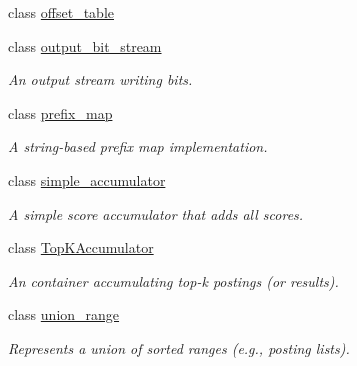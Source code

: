 \begin{DoxyCompactItemize}
class \mbox{\hyperlink{classirk_1_1offset__table}{offset\+\_\+table}}
\item 
class \mbox{\hyperlink{classirk_1_1output__bit__stream}{output\+\_\+bit\+\_\+stream}}
\begin{DoxyCompactList}\small\item\em An output stream writing bits. \end{DoxyCompactList}\item 
class \mbox{\hyperlink{classirk_1_1prefix__map}{prefix\+\_\+map}}
\begin{DoxyCompactList}\small\item\em A string-\/based prefix map implementation. \end{DoxyCompactList}\item 
class \mbox{\hyperlink{classirk_1_1simple__accumulator}{simple\+\_\+accumulator}}
\begin{DoxyCompactList}\small\item\em A simple score accumulator that adds all scores. \end{DoxyCompactList}\item 
class \mbox{\hyperlink{classirk_1_1TopKAccumulator}{Top\+K\+Accumulator}}
\begin{DoxyCompactList}\small\item\em An container accumulating top-\/k postings (or results). \end{DoxyCompactList}\item 
class \mbox{\hyperlink{classirk_1_1union__range}{union\+\_\+range}}
\begin{DoxyCompactList}\small\item\em Represents a union of sorted ranges (e.\+g., posting lists). \end{DoxyCompactList}\end{DoxyCompactItemize}
